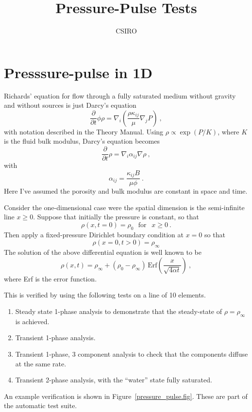 \documentclass[]{scrreprt}
\begin{document}
\title{Pressure-Pulse Tests}
\author{CSIRO}
\maketitle

\tableofcontents

\chapter{Presssure-pulse in 1D}


Richards' equation for flow through a fully saturated medium without
gravity and without sources is just Darcy's equation
\begin{equation}
\frac{\partial}{\partial t}\phi\rho = \nabla_{i}\left(\frac{\rho
  \kappa_{ij}}{\mu} \nabla_{j}P \right) \ ,
\end{equation}
with notation described in the Theory Manual.  Using $\rho \propto
\exp(P/K)$, where $K$ is the fluid bulk modulus, Darcy's equation
becomes
\begin{equation}
\frac{\partial}{\partial t}\rho = \nabla_{i}\alpha_{ij}\nabla\rho \ ,
\end{equation}
with
\begin{equation}
\alpha_{ij} = \frac{\kappa_{ij}B}{\mu\phi} \ .
\end{equation}
Here I've assumed the porosity and bulk modulus are constant in space
and time.

Consider the one-dimensional case were the spatial dimension is the
semi-infinite line $x\geq 0$.  Suppose that initially the pressure is
constant, so that
\begin{equation}
\rho(x, t=0) = \rho_{0} \ \ \ \mbox{for }\ \ x\geq 0 \ .
\end{equation}
Then apply a fixed-pressure Dirichlet boundary condition at $x=0$ so
that
\begin{equation}
\rho(x=0, t>0) = \rho_{\infty}
\end{equation}
The solution of the above differential equation is well known to be
\begin{equation}
\rho(x, t) = \rho_{\infty} + (\rho_{0} -
\rho_{\infty})\,\mbox{Erf}\left( \frac{x}{\sqrt{4\alpha t}} \right) \ ,
\label{eqn.exact.pp}
\end{equation}
where Erf is the error function.

This is verified by using the following tests on a line of
10 elements.
\begin{enumerate}
\item Steady state 1-phase analysis to demonstrate that the
  steady-state of $\rho = \rho_{\infty}$ is achieved.
\item Transient 1-phase analysis.
\item Transient 1-phase, 3 component analysis to check that the components diffuse at the same rate.
\item Transient 2-phase analysis, with the ``water'' state fully saturated.
\end{enumerate}
An example verification is shown in Figure~\ref{pressure_pulse.fig}.
These are part of the automatic test suite.
\end{document}
